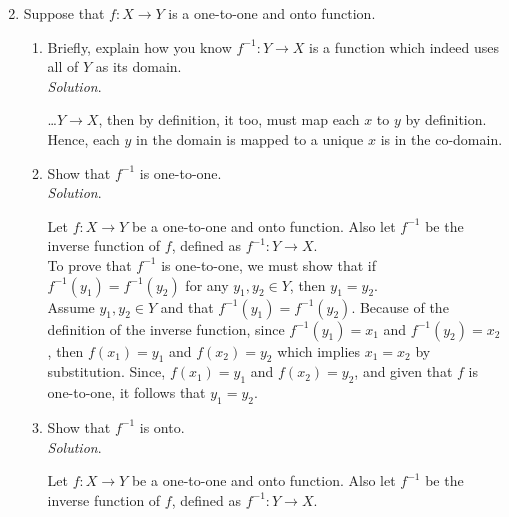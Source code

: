\documentclass[10pt]{article}
\newenvironment{solution}{\textit{Solution}.}
\newcommand{\proofseparator}{\noindent\makebox[\linewidth]{\rule{\textwidth}{0.4pt}}}
\newcommand{\sol}[1]{
    \vspace{5pt}
    \begin{solution}
    #1
    \end{solution}
    \proofseparator
}
\begin{document}
\newpage

\begin{enumerate}
    \setcounter{enumi}{1}
    \item Suppose that $f\colon X\rightarrow Y$ is a one-to-one and onto function.

          \begin{enumerate}
              \vspace{0.5cm}

              \item Briefly, explain how you know $f^{-1} \colon Y \rightarrow X$ is a function which indeed uses all of $Y$ as its domain. \\

                    \sol{
                        \dots $Y\rightarrow X$, then by definition, it too, must map each $x$ to $y$ by definition. Hence, each $y$ in the domain is mapped to a unique $x$ is in the co-domain.
                    }

                    \vspace{0.5cm}

              \item Show that $f^{-1}$ is one-to-one. \\

                    \sol{
                        Let $f\colon X \rightarrow Y$ be a one-to-one and onto function. Also let $f^{-1}$ be the inverse function of $f$, defined as $f^{-1} \colon Y \rightarrow X$. \\

                        To prove that $f^{-1}$ is one-to-one, we must show that if $f^{-1}(y_1) = f^{-1}(y_2)$ for any $y_1,y_2 \in Y$, then $y_1 = y_2$. \\

                        Assume $y_1,y_2 \in Y$ and that $f^{-1}(y_1) = f^{-1}(y_2)$. Because of the definition of the inverse function, since  $f^{-1}(y_1) = x_1$ and $f^{-1}(y_2) = x_2$, then $f(x_1) = y_1$ and $f(x_2) = y_2$ which implies $x_1 = x_2$ by substitution. Since, $f(x_1) = y_1$ and $f(x_2) = y_2$, and given that $f$ is one-to-one, it follows that $y_1 = y_2$.
                    }

                    \vspace{0.5cm}

              \item Show that $f^{-1}$ is onto. \\

                    \sol{
                        Let $f\colon X \rightarrow Y$ be a one-to-one and onto function. Also let $f^{-1}$ be the inverse function of $f$, defined as $f^{-1} \colon Y \rightarrow X$. \\

}
\end{enumerate}
\end{enumerate}
\end{document}
